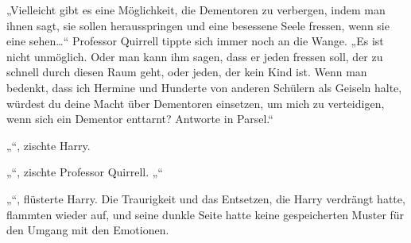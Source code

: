 „Vielleicht gibt es eine Möglichkeit, die Dementoren zu verbergen, indem man ihnen sagt, sie sollen herausspringen und eine besessene Seele fressen, wenn sie eine sehen…“
Professor Quirrell tippte sich immer noch an die Wange.
„Es ist nicht unmöglich. Oder man kann ihm sagen, dass er jeden fressen soll, der zu schnell durch diesen Raum geht, oder jeden, der kein Kind ist. Wenn man bedenkt, dass ich Hermine und Hunderte von anderen Schülern als Geiseln halte, würdest du deine Macht über Dementoren einsetzen, um mich zu verteidigen, wenn sich ein Dementor enttarnt? Antworte in Parsel.“

„“, zischte Harry.

„“, zischte Professor Quirrell. „“

„“, flüsterte Harry.
Die Traurigkeit und das Entsetzen, die Harry verdrängt hatte, flammten wieder auf, und seine dunkle Seite hatte keine gespeicherten Muster für den Umgang mit den Emotionen.

